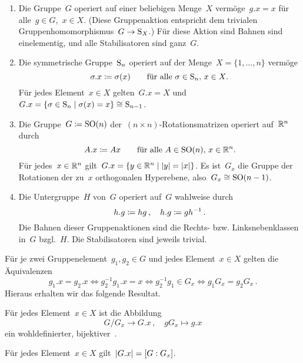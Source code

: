 \begin{example}
  \leavevmode
  \begin{enumerate}
    \item
      Die Gruppe~$G$ operiert auf einer beliebigen Menge~$X$ vermöge~$g.x = x$ für alle~$g \in G$,~$x \in X$.
      (Diese Gruppenaktion entspricht dem trivialen Gruppenhomomorphismus~$G \to \Sym_X$.)
      Für diese Aktion sind Bahnen sind einelementig, und alle Stabilisatoren sind ganz~$G$.
    \item
      Die symmetrische Gruppe~$\operatorname{S}_n$ operiert auf der Menge~$X = \{1, \dotsc, n\}$ vermöge
      \[
        \sigma . x \coloneqq \sigma(x)
        \qquad
        \text{für alle~$\sigma \in \operatorname{S}_n$,~$x \in X$.}
      \]
      Für jedes Element~$x \in X$ gelten~$G.x = X$ und~$G.x = \{ \sigma \in \Sym_n \suchthat \sigma(x) = x \} \cong \Sym_{n-1}$.
    \item
      Die Gruppe~$G \coloneqq \operatorname{SO}(n)$ der~$(n \times n)$\nobreakdash-\hspace{0pt}Rotationsmatrizen operiert auf~$\mathbb{R}^n$ durch
      \[
        A.x \coloneqq Ax
        \qquad
        \text{für alle~$A \in \operatorname{SO}(n)$,~$x \in \mathbb{R}^n$.}
      \]
      Für jedes~$x \in \mathbb{R}^n$ gilt~$G.x = \{ y \in \Real^n \suchthat \abs{y} = \abs{x} \}$.
      Es ist~$G_x$ die Gruppe der Rotationen der zu~$x$ orthogonalen Hyperebene, also~$G_x \cong \operatorname{SO}(n-1)$.
    \item
      Die Untergruppe~$H$ von~$G$ operiert auf~$G$ wahlweise durch
      \[
        h.g \coloneqq hg \,,
        \quad
        h.g \coloneqq g h^{-1} \,.
      \]
      Die Bahnen dieser Gruppenaktionen sind die Rechts- bzw. Linksnebenklassen in~$G$ bzgl.~$H$.
      Die Stabilisatoren sind jeweils trivial.
  \end{enumerate}
\end{example}

Für je zwei Gruppenelement~$g_1, g_2 \in G$ und jedes Element~$x \in X$ gelten die Äquivalenzen
\[
  g_1.x = g_2.x
  \iff
  g_2^{-1} g_1.x = x
  \iff
  g_2^{-1} g_1 \in G_x
  \iff
  g_1 G_x = g_2 G_x \,.
\]
Hieraus erhalten wir das folgende Resultat.

\begin{corollary}
  \label{isomorphism theorem for G-sets}
  Für jedes Element~$x \in X$ ist die Abbildung
  \[
    G/G_x \to G.x \,,
    \quad
    g G_x \mapsto g.x
  \]
  ein wohldefinierter, bijektiver~.
\end{corollary}

\begin{corollary}
  Für jedes Element~$x \in X$ gilt~$\lvert G.x\rvert = [G : G_x]$.
\end{corollary}

